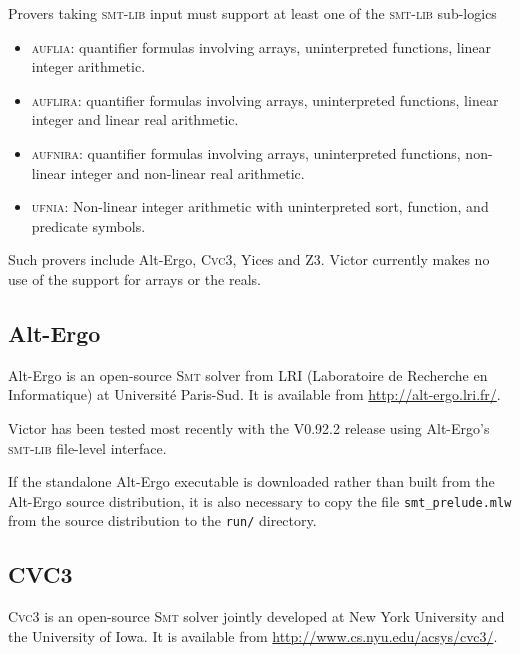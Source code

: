 \documentclass[12pt,fleqn]{article}
\newcommand{\cvcthree}{\textsc{Cvc}3}
\newcommand{\zthree}{\textsc{Z}3}
\newcommand{\yices}{Yices}
\newcommand{\smt}{\textsc{Smt}}
\newcommand{\smtlib}{\textsc{smt-lib}}
\begin{document}
Provers taking \smtlib{} input must support at least one of 
the \smtlib{} sub-logics
\begin{itemize}
\item \textsc{auflia}: quantifier formulas involving arrays, uninterpreted functions, linear integer arithmetic.
\item \textsc{auflira}: quantifier formulas involving arrays, uninterpreted functions, linear integer and linear real arithmetic.
\item \textsc{aufnira}: quantifier formulas involving arrays,
  uninterpreted functions, non-linear integer and non-linear real
  arithmetic.
\item 
\textsc{ufnia}: Non-linear integer arithmetic with uninterpreted
  sort, function, and predicate symbols.
\end{itemize}

Such provers include Alt-Ergo, \cvcthree, \yices{} and \zthree.
Victor currently makes no use of the support for arrays or the reals.
  

\subsection{Alt-Ergo}

Alt-Ergo is an open-source \smt{} solver from LRI (Laboratoire de
Recherche en Informatique) at Universit\'e Paris-Sud.  It is available
from \url{http://alt-ergo.lri.fr/}.

Victor has been tested most recently with the V0.92.2 release using
Alt-Ergo's \smtlib{} file-level interface.

If the standalone Alt-Ergo executable is downloaded rather than built
from the Alt-Ergo source distribution, it is also necessary to copy
the file \texttt{smt\_prelude.mlw} from the source distribution to the
\texttt{run/} directory.


\subsection{CVC3}

\cvcthree{} is an open-source \smt{} solver jointly developed at New
York University and the University of Iowa.  It is available from
\url{http://www.cs.nyu.edu/acsys/cvc3/}.
\end{document}
